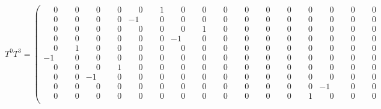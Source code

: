 \documentclass[10pt]{article}
\begin{document}
\[
T^{0}T^{3} = \left(\begin{smallmatrix}
\phantom{-}0 & \phantom{-}0 & \phantom{-}0 & \phantom{-}0 & \phantom{-}0 & \phantom{-}1 & \phantom{-}0 & \phantom{-}0 & \phantom{-}0 & \phantom{-}0 & \phantom{-}0 & \phantom{-}0 & \phantom{-}0 & \phantom{-}0 & \phantom{-}0 & \phantom{-}0 \\
\phantom{-}0 & \phantom{-}0 & \phantom{-}0 & \phantom{-}0 & -1 & \phantom{-}0 & \phantom{-}0 & \phantom{-}0 & \phantom{-}0 & \phantom{-}0 & \phantom{-}0 & \phantom{-}0 & \phantom{-}0 & \phantom{-}0 & \phantom{-}0 & \phantom{-}0 \\
\phantom{-}0 & \phantom{-}0 & \phantom{-}0 & \phantom{-}0 & \phantom{-}0 & \phantom{-}0 & \phantom{-}0 & \phantom{-}1 & \phantom{-}0 & \phantom{-}0 & \phantom{-}0 & \phantom{-}0 & \phantom{-}0 & \phantom{-}0 & \phantom{-}0 & \phantom{-}0 \\
\phantom{-}0 & \phantom{-}0 & \phantom{-}0 & \phantom{-}0 & \phantom{-}0 & \phantom{-}0 & -1 & \phantom{-}0 & \phantom{-}0 & \phantom{-}0 & \phantom{-}0 & \phantom{-}0 & \phantom{-}0 & \phantom{-}0 & \phantom{-}0 & \phantom{-}0 \\
\phantom{-}0 & \phantom{-}1 & \phantom{-}0 & \phantom{-}0 & \phantom{-}0 & \phantom{-}0 & \phantom{-}0 & \phantom{-}0 & \phantom{-}0 & \phantom{-}0 & \phantom{-}0 & \phantom{-}0 & \phantom{-}0 & \phantom{-}0 & \phantom{-}0 & \phantom{-}0 \\
-1 & \phantom{-}0 & \phantom{-}0 & \phantom{-}0 & \phantom{-}0 & \phantom{-}0 & \phantom{-}0 & \phantom{-}0 & \phantom{-}0 & \phantom{-}0 & \phantom{-}0 & \phantom{-}0 & \phantom{-}0 & \phantom{-}0 & \phantom{-}0 & \phantom{-}0 \\
\phantom{-}0 & \phantom{-}0 & \phantom{-}0 & \phantom{-}1 & \phantom{-}0 & \phantom{-}0 & \phantom{-}0 & \phantom{-}0 & \phantom{-}0 & \phantom{-}0 & \phantom{-}0 & \phantom{-}0 & \phantom{-}0 & \phantom{-}0 & \phantom{-}0 & \phantom{-}0 \\
\phantom{-}0 & \phantom{-}0 & -1 & \phantom{-}0 & \phantom{-}0 & \phantom{-}0 & \phantom{-}0 & \phantom{-}0 & \phantom{-}0 & \phantom{-}0 & \phantom{-}0 & \phantom{-}0 & \phantom{-}0 & \phantom{-}0 & \phantom{-}0 & \phantom{-}0 \\
\phantom{-}0 & \phantom{-}0 & \phantom{-}0 & \phantom{-}0 & \phantom{-}0 & \phantom{-}0 & \phantom{-}0 & \phantom{-}0 & \phantom{-}0 & \phantom{-}0 & \phantom{-}0 & \phantom{-}0 & \phantom{-}0 & -1 & \phantom{-}0 & \phantom{-}0 \\
\phantom{-}0 & \phantom{-}0 & \phantom{-}0 & \phantom{-}0 & \phantom{-}0 & \phantom{-}0 & \phantom{-}0 & \phantom{-}0 & \phantom{-}0 & \phantom{-}0 & \phantom{-}0 & \phantom{-}0 & \phantom{-}1 & \phantom{-}0 & \phantom{-}0 & \phantom{-}0 \\

\end{smallmatrix}\]
\end{document}
